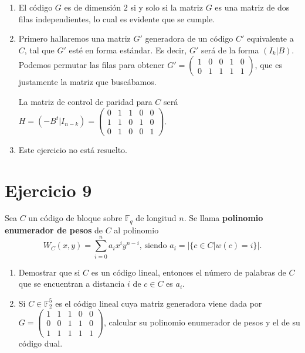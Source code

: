 \begin{enumerate}[label=\alph*)]
	\item El código $G$ es de dimensión $2$ si y solo si la matriz $G$ es una matriz de dos filas independientes, lo cual es evidente que se cumple.
	\item Primero hallaremos una matriz $G'$ generadora de un código $C'$ equivalente a $C$, tal que $G'$ esté en forma estándar. Es decir, $G'$ será de la forma $(I_k|B)$.
	Podemos permutar las filas para obtener
	$G' = \begin{pmatrix}
		1 & 0 & 0 & 1 & 0 \\
		0 & 1 & 1 & 1 & 1
	\end{pmatrix}$, que es justamente la matriz que buscábamos.
	
	La matriz de control de paridad para $C$ será $H = (-B^t|I_{n-k}) = \begin{pmatrix}
		0 & 1 & 1 & 0 & 0 \\
		1 & 1 & 0 & 1 & 0 \\
		0 & 1 & 0 & 0 & 1
	\end{pmatrix}$.
	\item \hspace*{1mm}
	
	\begin{draftBox}
		Este ejercicio no está resuelto.
	\end{draftBox}
\end{enumerate}

\section{Ejercicio 9}

\begin{formulationBox}
	Sea $C$ un código de bloque sobre $\mathbb{F}_q$ de longitud $n$. Se llama \textbf{polinomio enumerador de pesos} de $C$ al polinomio
	\[W_C(x, y) = \sum_{i=0}^{n} a_i x^i y^{n-i}\textrm{, siendo }a_i = |\{c\in C | w(c) = i\}|.\]
	
	\begin{enumerate}[label=\alph*)]
		\item Demostrar que si $C$ es un código lineal, entonces el número de palabras de $C$ que se encuentran a distancia $i$ de $c \in C$ es $a_i$.
		\item Si $C \in \mathbb{F}_2^5$ es el código lineal cuya matriz generadora viene dada por $G = \begin{pmatrix}
			1 & 1 & 1 & 0 & 0 \\
			0 & 0 & 1 & 1 & 0 \\
			1 & 1 & 1 & 1 & 1
		\end{pmatrix}$, calcular su polinomio enumerador de pesos y el de su código dual.
	\end{enumerate}
\end{formulationBox}

